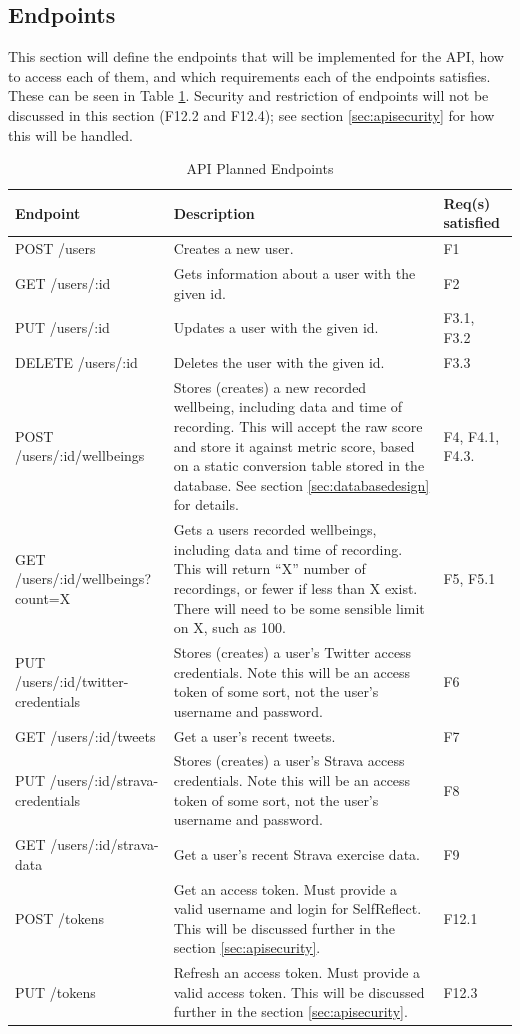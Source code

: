 \documentclass[11pt,openright,a4paper]{report}
\begin{document}
\newpage
\subsection{Endpoints} \label{sec:apiendpoints}
This section will define the endpoints that will be implemented for the API,  how to access each of them, and which requirements each of the endpoints satisfies. These can be seen in Table \ref{tab:designendpoints}. Security and restriction of endpoints will not be discussed in this section (F12.2 and F12.4); see section \ref{sec:apisecurity} for how this will be handled.

\begin{longtable}{| p{6cm} | p{6cm} | p{2cm} |}
\caption{API Planned Endpoints}
\label{tab:designendpoints} \\
\hline
\textbf{Endpoint} & \textbf{Description} & \textbf{Req(s) satisfied} \\ \hline
POST /users & Creates a new user. & F1 \\ \hline
GET /users/:id & Gets information about a user with the given id. & F2 \\ \hline
PUT /users/:id & Updates a user with the given id. & F3.1, F3.2 \\ \hline
DELETE /users/:id & Deletes the user with the given id. & F3.3 \\ \hline
POST /users/:id/wellbeings & Stores (creates) a new recorded wellbeing, including data and time of recording. This will accept the raw score and store it against metric score, based on a static conversion table stored in the database. See section \ref{sec:databasedesign} for details. & F4, F4.1, F4.3. \\ \hline
GET /users/:id/wellbeings?count=X & Gets a users recorded wellbeings, including data and time of recording. This will return \enquote{X} number of recordings, or fewer if less than X exist. There will need to be some sensible limit on X, such as 100. & F5, F5.1\\ \hline
PUT /users/:id/twitter-credentials & Stores (creates) a user's Twitter access credentials. Note this will be an access token of some sort, not the user's username and password. & F6 \\ \hline
GET /users/:id/tweets & Get a user's recent tweets. & F7 \\ \hline
PUT /users/:id/strava-credentials  & Stores (creates) a user's Strava access credentials. Note this will be an access token of some sort, not the user's username and password.& F8 \\ \hline
GET /users/:id/strava-data  & Get a user's recent Strava exercise data. & F9 \\ \hline
POST /tokens & Get an access token. Must provide a valid username and login for SelfReflect. This will be discussed further in the section \ref{sec:apisecurity}. & F12.1 \\ \hline
PUT /tokens & Refresh an access token. Must provide a valid access token. This will be discussed further in the section \ref{sec:apisecurity}. & F12.3 \\ \hline
\end{longtable}
\end{document}
